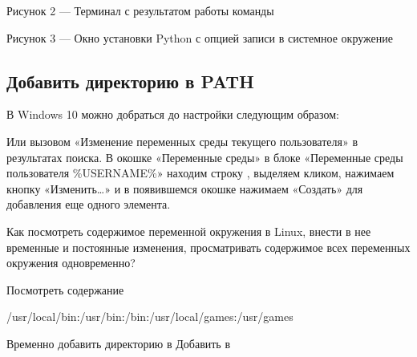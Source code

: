 \documentclass[letterpaper,10pt,russian]{sphinxmanual}
\begin{document}
\sphinxAtStartPar
{}

\sphinxAtStartPar
Рисунок 2 — Терминал с результатом работы команды 

\sphinxAtStartPar
{}

\sphinxAtStartPar
Рисунок 3 — Окно установки Python с опцией записи в системное окружение 


\subsection{Добавить директорию в PATH}
\label{\detokenize{educational_materials/path_venv/content:path}}
\sphinxAtStartPar
В Windows 10 можно добраться до настройки  следующим образом:

\sphinxAtStartPar
{}

\sphinxAtStartPar
Или вызовом «Изменение переменных среды текущего пользователя» в результатах поиска.
В окошке «Переменные среды» в блоке «Переменные среды пользователя \%USERNAME\%» находим строку , выделяем кликом, нажимаем кнопку «Изменить…» и в появившемся окошке нажимаем «Создать» для добавления еще одного элемента.

\sphinxAtStartPar
Как посмотреть содержимое переменной окружения  в Linux, внести в нее временные и постоянные изменения, просматривать содержимое всех переменных окружения одновременно?

\sphinxAtStartPar
Посмотреть содержание 

\begin{sphinxVerbatim}[commandchars=\\\{\}]
/usr/local/bin:/usr/bin:/bin:/usr/local/games:/usr/games
\end{sphinxVerbatim}

\sphinxAtStartPar
Временно добавить директорию в 
Добавить  в 

\sphinxAtStartPar
{}
\end{document}
